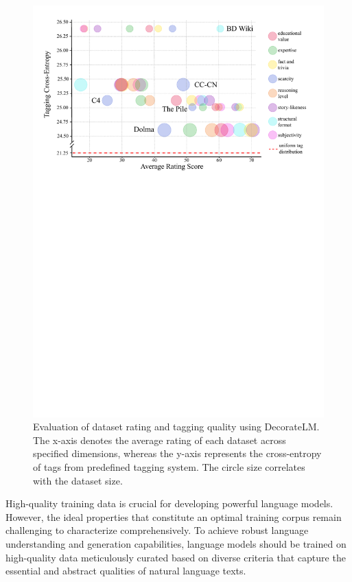 \documentclass[11pt]{article}
\begin{document}
\begin{figure}
    \centering
    \includegraphics[width=\textwidth]{figs/dataset_level_rate_tag.pdf}
    \caption{Evaluation of dataset rating and tagging quality using DecorateLM. The x-axis denotes the average rating of each dataset across specified dimensions, whereas the y-axis represents the cross-entropy of tags from predefined tagging system. The circle size correlates with the dataset size.}
    \label{fig:dataset_level_quatlity}
\end{figure}

High-quality training data is crucial for developing powerful language models. However, the ideal properties that constitute an optimal training corpus remain challenging to characterize comprehensively. To achieve robust language understanding and generation capabilities, language models should be trained on high-quality data meticulously curated based on diverse criteria that capture the essential and abstract qualities of natural language texts. 
\end{document}
